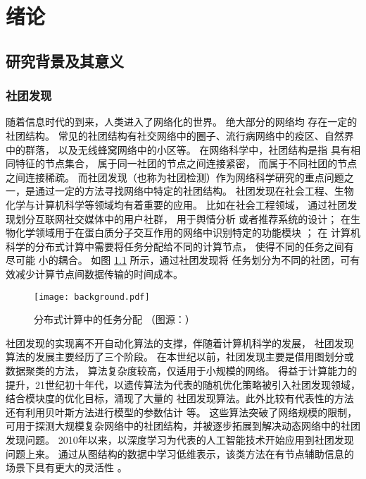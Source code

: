 
\chapter{绪论}


\section{研究背景及其意义}
\subsection{社团发现}\label{sec:community}
随着信息时代的到来，人类进入了网络化的世界。
绝大部分的网络均
存在一定的社团结构\cite{wang2012network}。
常见的社团结构有社交网络中的圈子、流行病网络中的疫区、自然界中的群落，
以及无线蜂窝网络中的小区等。
在网络科学中，社团结构是指
具有相同特征的节点集合， 属于同一社团的节点之间连接紧密，
而属于不同社团的节点之间连接稀疏。
而社团发现（也称为社团检测）作为网络科学研究的重点问题之一，是通过一定的方法寻找网络中特定的社团结构。
社团发现在社会工程、生物化学与计算机科学等领域均有着重要的应用。
比如在社会工程领域，
通过社团发现划分互联网社交媒体中的用户社群\cite{zalmout2013twitter}，
用于舆情分析\cite{yang2018opinion}
或者推荐系统的设计\cite{cao2015recommendation}；
在生物化学领域用于在蛋白质分子交互作用的网络中识别特定的功能模块 \cite{ayati2015mobas}；
在
计算机科学的分布式计算中需要将任务分配给不同的计算节点，
使得不同的任务之间有尽可能
小的耦合\cite{topcuoglu2002performance}。
如图 \ref{fig:distributed_computing} 所示，通过社团发现将
任务划分为不同的社团，可有效减少计算节点间数据传输的时间成本。

\begin{figure}[!ht]
    \centering
    \texttt{[image: background.pdf]}
    \caption{分布式计算中的任务分配 （图源：）}
    \label{fig:distributed_computing}
\end{figure}


社团发现的实现离不开自动化算法的支撑，伴随着计算机科学的发展，
社团发现算法的发展主要经历了三个阶段。
在本世纪以前，社团发现主要是借用图划分或数据聚类的方法，
算法复杂度较高，仅适用于小规模的网络。
得益于计算能力的提升，21世纪初十年代，以遗传算法为代表的随机优化策略被引入社团发现领域，
结合模块度的优化目标，涌现了大量的
社团发现算法。此外比较有代表性的方法还有利用贝叶斯方法进行模型的参数估计 \cite{jin2023survey}
等。
这些算法突破了网络规模的限制，可用于探测大规模复杂网络中的社团结构，并被逐步拓展到解决动态网络中的社团发现问题。
2010年以来，以深度学习为代表的人工智能技术开始应用到社团发现问题上来。
通过从图结构的数据中学习低维表示，该类方法在有节点辅助信息的场景下具有更大的灵活性
\cite{Su_2022}。

